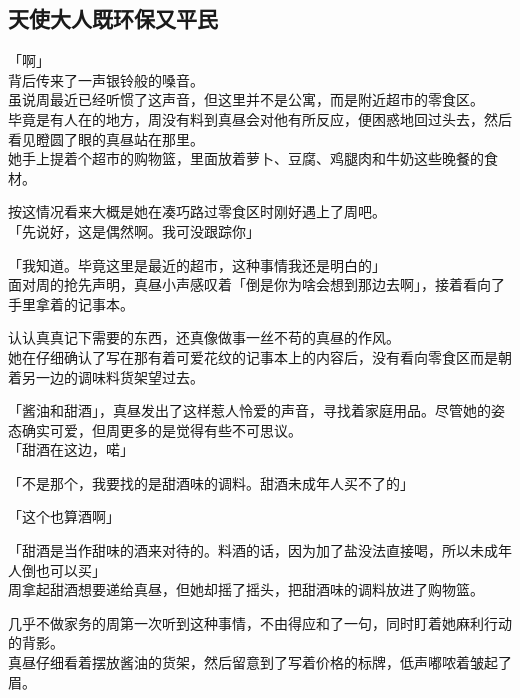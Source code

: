 \subsection{天使大人既环保又平民}

「啊」\\

背后传来了一声银铃般的嗓音。\\

虽说周最近已经听惯了这声音，但这里并不是公寓，而是附近超市的零食区。\\

毕竟是有人在的地方，周没有料到真昼会对他有所反应，便困惑地回过头去，然后看见瞪圆了眼的真昼站在那里。\\

她手上提着个超市的购物篮，里面放着萝卜、豆腐、鸡腿肉和牛奶这些晚餐的食材。

按这情况看来大概是她在凑巧路过零食区时刚好遇上了周吧。\\

「先说好，这是偶然啊。我可没跟踪你」

「我知道。毕竟这里是最近的超市，这种事情我还是明白的」\\

面对周的抢先声明，真昼小声感叹着「倒是你为啥会想到那边去啊」，接着看向了手里拿着的记事本。

认认真真记下需要的东西，还真像做事一丝不苟的真昼的作风。\\

她在仔细确认了写在那有着可爱花纹的记事本上的内容后，没有看向零食区而是朝着另一边的调味料货架望过去。

「酱油和甜酒」，真昼发出了这样惹人怜爱的声音，寻找着家庭用品。尽管她的姿态确实可爱，但周更多的是觉得有些不可思议。\\

「甜酒在这边，喏」

「不是那个，我要找的是甜酒味的调料。甜酒未成年人买不了的」

「这个也算酒啊」

「甜酒是当作甜味的酒来对待的。料酒的话，因为加了盐没法直接喝，所以未成年人倒也可以买」\\

周拿起甜酒想要递给真昼，但她却摇了摇头，把甜酒味的调料放进了购物篮。

几乎不做家务的周第一次听到这种事情，不由得应和了一句，同时盯着她麻利行动的背影。\\

真昼仔细看着摆放酱油的货架，然后留意到了写着价格的标牌，低声嘟哝着皱起了眉。\\

